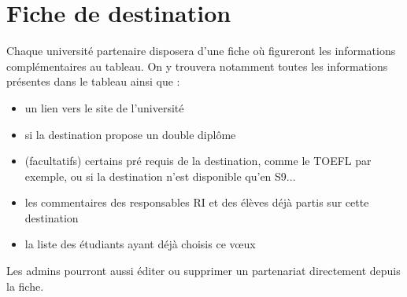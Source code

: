  \section{Fiche de destination}
 \label{sec::sheet_univ}
 Chaque université partenaire disposera d'une fiche où figureront les informations complémentaires au tableau.
 On y trouvera notamment toutes les informations présentes dans le tableau ainsi que :
 \begin{itemize}
 	\item un lien vers le site de l'université
 	\item si la destination propose un double diplôme
 	\item (facultatifs) certains pré requis de la destination, comme le TOEFL par exemple, ou si la destination n'est disponible qu'en S9...
 	\item les commentaires des responsables RI et des élèves déjà partis sur cette destination
 	\item la liste des étudiants ayant déjà choisis ce vœux
 \end{itemize}
 

 
 Les admins pourront aussi éditer ou supprimer un partenariat directement depuis la fiche.
